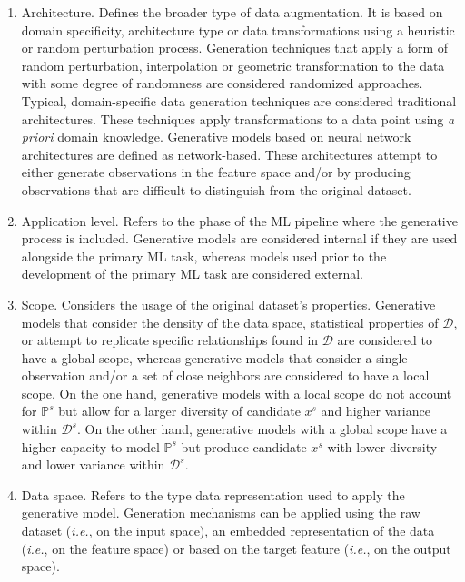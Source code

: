 \documentclass[parskip=full]{scrartcl}
\begin{document}
\begin{enumerate}

    \item Architecture. Defines the broader type of data augmentation. It is
        based on domain specificity, architecture type or data transformations
        using a heuristic or random perturbation process. Generation
        techniques that apply a form of random perturbation, interpolation or
        geometric transformation to the data with some degree of randomness
        are considered randomized approaches. Typical, domain-specific data
        generation techniques are considered traditional architectures. These
        techniques apply transformations to a data point using \textit{a
        priori} domain knowledge. Generative models based on neural network
        architectures are defined as network-based. These architectures
        attempt to either generate observations in the feature space and/or by
        producing observations that are difficult to distinguish from the
        original dataset.

    \item Application level. Refers to the phase of the ML pipeline where the
        generative process is included. Generative models are considered
        internal if they are used alongside the primary ML task, whereas
        models used prior to the development of the primary ML task are
        considered external.

    \item Scope. Considers the usage of the original dataset's properties.
        Generative models that consider the density of the data space,
        statistical properties of $\mathcal{D}$, or attempt to replicate
        specific relationships found in $\mathcal{D}$ are considered to have
        a global scope, whereas generative models that consider a single
        observation and/or a set of close neighbors are considered to have a
        local scope. On the one hand, generative models with a local scope do
        not account for $\mathbb{P}^s$ but allow for a larger diversity of
        candidate $x^s$ and higher variance within $\mathcal{D}^s$. On the
        other hand, generative models with a global scope have a higher
        capacity to model $\mathbb{P}^s$ but produce candidate $x^s$ with
        lower diversity and lower variance within $\mathcal{D}^s$.

    \item Data space. Refers to the type data representation used to apply the
        generative model. Generation mechanisms can be applied using the raw
        dataset (\textit{i.e.}, on the input space), an embedded
        representation of the data (\textit{i.e.}, on the feature space) or
        based on the target feature (\textit{i.e.}, on the output space).

\end{enumerate}
\end{document}
